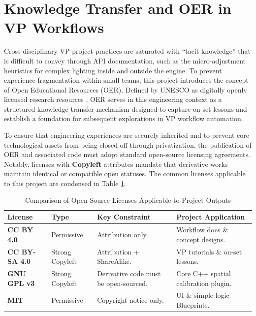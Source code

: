 \documentclass[12pt,a4paper]{report}
\begin{document}
\section{Knowledge Transfer and OER in VP Workflows}
Cross-disciplinary VP project practices are saturated with ``tacit knowledge'' that is difficult to convey through API documentation, such as the micro-adjustment heuristics for complex lighting inside and outside the engine. To prevent experience fragmentation within small teams, this project introduces the concept of Open Educational Resources (OER). Defined by UNESCO as digitally openly licensed research resources \cite{unesco2019oer}, OER serves in this engineering context as a structured knowledge transfer mechanism designed to capture on-set lessons and establish a foundation for subsequent explorations in VP workflow automation.

To ensure that engineering experiences are securely inherited and to prevent core technological assets from being closed off through privatization, the publication of OER and associated code must adopt standard open-source licensing agreements. Notably, licenses with \textbf{Copyleft} attributes mandate that derivative works maintain identical or compatible open statuses. The common licenses applicable to this project are condensed in Table \ref{tab:licenses}.

\begin{table}[H]
    \centering
    \caption{Comparison of Open-Source Licenses Applicable to Project Outputs}
    \label{tab:licenses}
    \renewcommand{\arraystretch}{1.2}
    \begin{tabular}{@{}lll p{4.5cm}@{}}
        \toprule
        \textbf{License} & \textbf{Type} & \textbf{Key Constraint} & \textbf{Project Application} \\
        \midrule
        \textbf{CC BY 4.0} & Permissive & Attribution only. & Workflow docs \& concept designs. \\
        \textbf{CC BY-SA 4.0} & Strong Copyleft & Attribution + ShareAlike. & VP tutorials \& on-set lessons. \\
        \textbf{GNU GPL v3} & Strong Copyleft & Derivative code must be open-sourced. & Core C++ spatial calibration plugin. \\
        \textbf{MIT} & Permissive & Copyright notice only. & UI \& simple logic Blueprints. \\
        \bottomrule
    \end{tabular}
\end{table}
\end{document}
